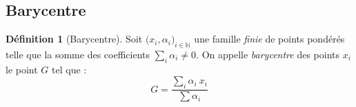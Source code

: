 \documentclass[11pt,a4paper]{report}
\theoremstyle{definition}
\newtheorem{dfn}[theorem]{Définition}
\begin{document}
\subsection{Barycentre} %
\label{sub:barycentre}
\begin{dfn}[Barycentre]
     Soit $\big( x_i,\alpha_i\big)_{i\in \mathbb{N}}$ une famille \emph{finie} de points pondérés telle que la somme des coefficients $\sum_i \alpha_i \neq 0$. On appelle \emph{barycentre} des points $x_i$ le point $G$ tel que : 
     \begin{equation}
     G = \dfrac{\displaystyle\sum_i \alpha_i~x_i}{\sum \alpha_i}
     \end{equation}
\end{dfn}

\end{document}
